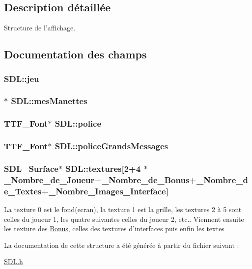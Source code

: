 \subsection{Description détaillée}
Structure de l'affichage. 

\subsection{Documentation des champs}
\hypertarget{structSDL_aed6e34a843f7e278abbc6401e7a86748}{
\subsubsection[{jeu}]{ S\-D\-L\-::jeu}}\label{structSDL_aed6e34a843f7e278abbc6401e7a86748}
\hypertarget{structSDL_ace23bf8418b8f58e086b6e608e9d0ba0}{
\subsubsection[{mes\-Manettes}]{$\ast$ S\-D\-L\-::mes\-Manettes}}\label{structSDL_ace23bf8418b8f58e086b6e608e9d0ba0}
\hypertarget{structSDL_a1ad36295e29f111c716ccdb0e7265a4e}{
\subsubsection[{police}]{\setlength{\rightskip}{0pt plus 5cm}T\-T\-F\-\_\-\-Font$\ast$ S\-D\-L\-::police}}\label{structSDL_a1ad36295e29f111c716ccdb0e7265a4e}
\hypertarget{structSDL_a6b8f503288d42f8dbe8bb3ff97629404}{
\subsubsection[{police\-Grands\-Messages}]{\setlength{\rightskip}{0pt plus 5cm}T\-T\-F\-\_\-\-Font$\ast$ S\-D\-L\-::police\-Grands\-Messages}}\label{structSDL_a6b8f503288d42f8dbe8bb3ff97629404}
\hypertarget{structSDL_a7a8c5288d76cf72d0f5ba90ef4046d58}{
\subsubsection[{textures}]{\setlength{\rightskip}{0pt plus 5cm}S\-D\-L\-\_\-\-Surface$\ast$ S\-D\-L\-::textures\mbox{[}2+4 $\ast${\bf \-\_\-\-Nombre\-\_\-de\-\_\-\-Joueur}+{\bf \-\_\-\-Nombre\-\_\-de\-\_\-\-Bonus}+{\bf \-\_\-\-Nombre\-\_\-de\-\_\-\-Textes}+{\bf \-\_\-\-Nombre\-\_\-\-Images\-\_\-\-Interface}\mbox{]}}}\label{structSDL_a7a8c5288d76cf72d0f5ba90ef4046d58}
La texture 0 est le fond(ecran), la texture 1 est la grille, les textures 2 à 5 sont celles du joueur 1, les quatre suivantes celles du joueur 2, etc.. Viennent ensuite les texture des \hyperlink{structBonus}{Bonus}, celles des textures d'interfaces puis enfin les textes 

La documentation de cette structure a été générée à partir du fichier suivant \-:\begin{DoxyCompactItemize}
\item 
\hyperlink{SDL_8h}{S\-D\-L.\-h}\end{DoxyCompactItemize}
